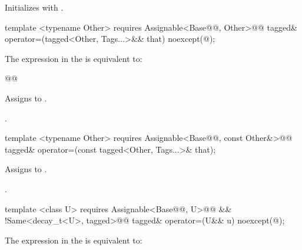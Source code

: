 {\begin{itemdescr}
\pnum
\effects Initializes  with .
\end{itemdescr}

\begin{itemdecl}
template <typename Other>
  requires Assignable<Base@\newtxt{\&}@, Other>@\newtxt{()}@
tagged& operator=(tagged<Other, Tags...>&& that) noexcept(@\seebelow@);
\end{itemdecl}

\begin{itemdescr}
\pnum
\remarks The expression in the  is equivalent to:

\begin{codeblock}
@@
\end{codeblock}

\pnum
\effects Assigns  to .

\pnum
\returns {}.
\end{itemdescr}

\begin{itemdecl}
template <typename Other>
  requires Assignable<Base@\newtxt{\&}@, const Other&>@\newtxt{()}@
tagged& operator=(const tagged<Other, Tags...>& that);
\end{itemdecl}

\begin{itemdescr}
\pnum
\effects Assigns  to .

\pnum
\returns {}.
\end{itemdescr}

\begin{itemdecl}
template <class U>
  requires Assignable<Base@\newtxt{\&}@, U>@\newtxt{()}@ && !Same<decay_t<U>, tagged>@\newtxt{()}@
tagged& operator=(U&& u) noexcept(@\seebelow@);
\end{itemdecl}

\begin{itemdescr}
\pnum
\remarks The expression in the  is equivalent to:


\end{itemdescr}}
